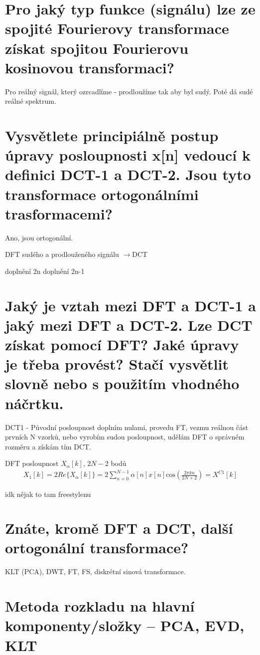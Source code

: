 \documentclass[a4paper,12pt]{article}   %
\newcommand{\rrarr}{$\rightarrow$}
\newcommand{\mt}[1]{$#1$}
\begin{document}
\section{Pro jaký typ funkce (signálu) lze ze spojité Fourierovy transformace získat spojitou Fourierovu kosinovou transformaci?}
Pro reálný signál, který ozrcadlíme - prodloužíme tak aby byl sudý. Poté dá sudé reálné spektrum.


\section{Vysvětlete principiálně postup úpravy posloupnosti x[n] vedoucí k definici DCT-1 a DCT-2. Jsou tyto transformace ortogonálními trasformacemi?}
Ano, jsou ortogonální. 

DFT sudého a prodlouženého signálu \rrarr DCT
\begin{outline}[enumerate]
        \1 doplnění 2n
        \1 doplnění 2n-1
\end{outline}


\section{Jaký je vztah mezi DFT a DCT-1 a jaký mezi DFT a DCT-2. Lze DCT získat pomocí DFT? Jaké úpravy je třeba provést? Stačí vysvětlit slovně nebo s použitím vhodného náčrtku.}

DCT1 - Původní posloupnost doplním nulami, provedu FT, vezmu reálnou část prvních N vzorků, nebo vyrobím sudou posloupnost, udělám DFT o správném rozměru a získám tím DCT.

DFT posloupnost \mt{X_\alpha[k]}, \mt{2N-2} bodů
\begin{align*}
        X_1[k] = 2Re\{X_\alpha[k]\} = 2\sum_{n=0}^{N-1}\alpha[n]x[n]\text{cos}\left(\frac{2\pi kn}{2N+2}\right) = X^{C1}[k]
\end{align*}

idk nějak to tam freestylenu


\section{Znáte, kromě DFT a DCT, další ortogonální transformace?}
KLT (PCA), DWT, FT, FS, diskrétní sinová transformace.


\clearpage 

\section*{Metoda rozkladu na hlavní komponenty/složky – PCA, EVD, KLT}
\end{document}
